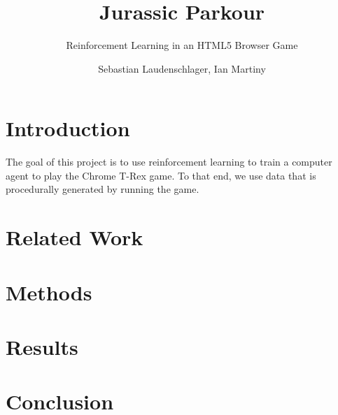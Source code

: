 \documentclass{scrartcl}
\title{Jurassic Parkour}
\subtitle{Reinforcement Learning in an HTML5 Browser Game}
\author{Sebastian Laudenschlager, Ian Martiny}
\begin{document}
\maketitle

\section{Introduction}

The goal of this project is to use reinforcement learning to train a computer agent to play the Chrome T-Rex game. To that end, we use data that is procedurally generated by running the game.

\section{Related Work}

\section{Methods}

\section{Results}

\section{Conclusion}
\end{document}
